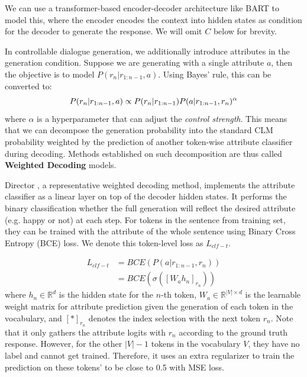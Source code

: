 We can use a transformer-based encoder-decoder architecture like BART \cite{lewis2020bart} to model this, where the encoder encodes the context into hidden states as condition for the decoder to generate the response. We will omit $C$ below for brevity.

In controllable dialogue generation, we additionally introduce attributes in the generation condition. Suppose we are generating with a single attribute $a$, then the objective is to model $P(r_n|r_{1:n-1}, a)$. Using Bayes' rule, this can be converted to:
\begin{equation}
    \small
    P(r_n|r_{1:n-1}, a) \propto P(r_n|r_{1:n-1}) P(a|r_{1:n-1}, r_n)^{\alpha}
    \label{eqn:single_wd}
\end{equation}
where $\alpha$ is a hyperparameter that can adjust the \textit{control strength}. This means that we can decompose the generation probability into the standard CLM probability weighted by the prediction of another token-wise attribute classifier during decoding. Methods established on such decomposition are thus called \textbf{Weighted Decoding} models.

Director \citep{arora2022director}, a representative weighted decoding method, implements the attribute classifier as a linear layer on top of the decoder hidden states. It performs the binary classification whether the full generation will reflect the desired attribute  (e.g. happy or not) at each step. For tokens in the sentence from training set, they can be trained with the attribute of the whole sentence using Binary Cross Entropy (BCE) loss. We denote this token-level loss as $L_{clf-t}$. 

\begin{equation}
    \begin{aligned}
        L_{clf-t} &= BCE(P(a | r_{1:n-1}, r_n)) \\
                  &= BCE(\sigma([W_a h_n]_{r_n}))
    \end{aligned}
    \label{eqn:clf_t}
\end{equation}
where $h_n \in \mathbb{R}^{d}$ is the hidden state for the $n$-th token, $W_a \in \mathbb{R}^{|V| \times d}$ is the learnable weight matrix for attribute prediction given the generation of each token in the vocabulary, and $[*]_{r_n}$ denotes the index selection with the next token $r_n$. Note that it only gathers the attribute logits with $r_n$ according to the ground truth response. However, for the other $|V|-1$ tokens in the vocabulary $V$, they have no label and cannot get trained. Therefore, it uses an extra regularizer to train the prediction on these tokens' to be close to 0.5 with MSE loss.  

